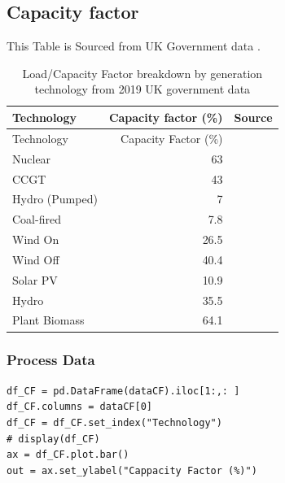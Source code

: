 \documentclass[11pt]{article}
\numberwithin{equation}{section}
\begin{document}
\subsection{Capacity factor \label{secAppCFBreakdown}}
\label{sec:org8277ec7}
This Table is Sourced from UK Government data \cite{NonRE_CF,RenewableElecricityCap}.
\begin{table}[H]
\caption{\label{tabCFBreakdownGov2020}Load/Capacity Factor breakdown by generation technology from 2019 UK government data\cite{DeptEnerLCOE2016,NonRE_CF}}
\centering
\begin{tabular}{lrl}
\toprule
Technology & Capacity factor (\%) & Source\\
\midrule
Technology & Capacity Factor (\%) & \\
Nuclear & 63 & \cite{NonRE_CF}\\
CCGT & 43 & \cite{NonRE_CF}\\
Hydro (Pumped) & 7 & \cite{NonRE_CF}\\
Coal-fired & 7.8 & \cite{RenewableElecricityCap}\\
Wind On & 26.5 & \cite{RenewableElecricityCap}\\
Wind Off & 40.4 & \cite{RenewableElecricityCap}\\
Solar PV & 10.9 & \cite{RenewableElecricityCap}\\
Hydro & 35.5 & \cite{RenewableElecricityCap}\\
Plant Biomass & 64.1 & \cite{RenewableElecricityCap}\\
\bottomrule
\end{tabular}
\end{table}

\subsubsection{Process Data}
\label{sec:org60c18de}

\begin{verbatim}
df_CF = pd.DataFrame(dataCF).iloc[1:,: ]
df_CF.columns = dataCF[0]
df_CF = df_CF.set_index("Technology")
# display(df_CF)
ax = df_CF.plot.bar()
out = ax.set_ylabel("Cappacity Factor (%)")
\end{verbatim}
\end{document}
